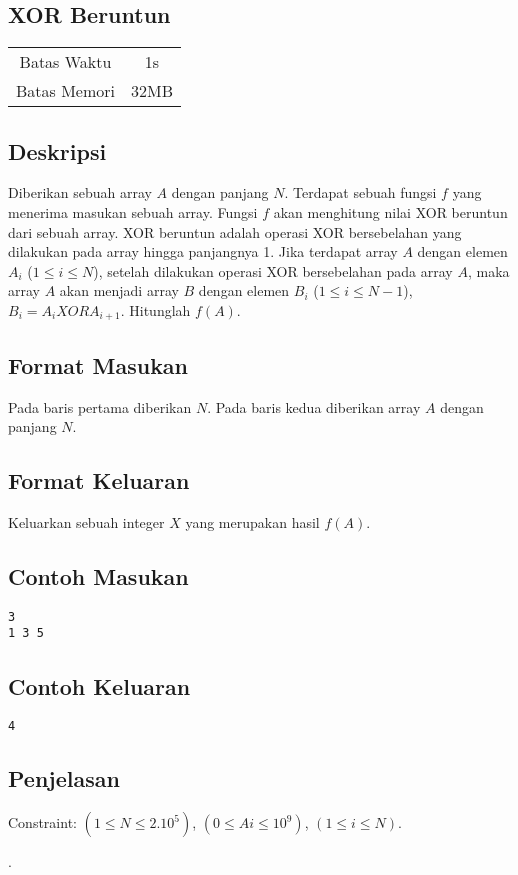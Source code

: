 \documentclass{article}
\begin{document}
\begin{center}
    \section*{XOR Beruntun} %

    \begin{tabular}{ | c c | }
        \hline
        Batas Waktu  & 1s \\    %
        Batas Memori & 32MB \\  %
        \hline
    \end{tabular}
\end{center}

\subsection*{Deskripsi}
Diberikan sebuah array $A$ dengan panjang $N$.
Terdapat sebuah fungsi $f$ yang menerima masukan sebuah array.
Fungsi $f$ akan menghitung nilai XOR beruntun dari sebuah array.
XOR beruntun adalah operasi XOR bersebelahan yang dilakukan pada array hingga panjangnya 1.
Jika terdapat array $A$ dengan elemen $A_{i}$ ($1 \leq i \leq N$), 
setelah dilakukan operasi XOR bersebelahan pada array $A$, 
maka array $A$ akan menjadi array $B$ dengan elemen $B_{i}$ ($1 \leq i \leq N-1$), 
$B_{i} = A_{i} XOR A_{i + 1}$.
Hitunglah $f(A)$.

\subsection*{Format Masukan}

Pada baris pertama diberikan $N$.
Pada baris kedua diberikan array $A$ dengan panjang $N$.

\subsection*{Format Keluaran}

Keluarkan sebuah integer $X$ yang merupakan hasil $f(A)$.
\\

\begin{multicols}{2}
\subsection*{Contoh Masukan}
\begin{lstlisting}
3
1 3 5
\end{lstlisting}
\columnbreak
\subsection*{Contoh Keluaran}
\begin{lstlisting}
4
\end{lstlisting}
\vfill
\null
\end{multicols}

\subsection*{Penjelasan}
Constraint:
$(1 \leq N \leq 2.10^5)$,
$(0 \leq Ai \leq 10^9)$,
$(1 \leq i \leq N)$.

\pagebreak.
\end{document}
